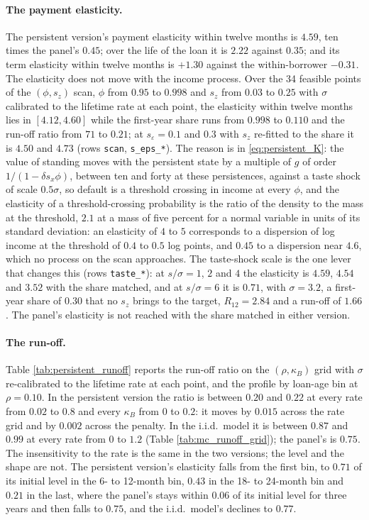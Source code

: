 \paragraph{The payment elasticity.} The persistent version's payment elasticity within twelve months is $4.59$, ten times the panel's $0.45$; over the life of the loan it is $2.22$ against $0.35$; and its term elasticity within twelve months is $+1.30$ against the within-borrower $-0.31$. The elasticity does not move with the income process. Over the 34 feasible points of the $(\phi, s_z)$ scan, $\phi$ from $0.95$ to $0.998$ and $s_z$ from $0.03$ to $0.25$ with $\sigma$ calibrated to the lifetime rate at each point, the elasticity within twelve months lies in $[4.12, 4.60]$ while the first-year share runs from $0.998$ to $0.110$ and the run-off ratio from $71$ to $0.21$; at $s_\varepsilon = 0.1$ and $0.3$ with $s_z$ re-fitted to the share it is $4.50$ and $4.73$ (rows \texttt{scan}, \texttt{s\_eps\_*}). The reason is in \eqref{eq:persistent_K}: the value of standing moves with the persistent state by a multiple of $g$ of order $1/(1 - \delta s_x \phi)$, between ten and forty at these persistences, against a taste shock of scale $0.5\sigma$, so default is a threshold crossing in income at every $\phi$, and the elasticity of a threshold-crossing probability is the ratio of the density to the mass at the threshold, $2.1$ at a mass of five percent for a normal variable in units of its standard deviation: an elasticity of $4$ to $5$ corresponds to a dispersion of log income at the threshold of $0.4$ to $0.5$ log points, and $0.45$ to a dispersion near $4.6$, which no process on the scan approaches. The taste-shock scale is the one lever that changes this (rows \texttt{taste\_*}): at $s/\sigma = 1$, $2$ and $4$ the elasticity is $4.59$, $4.54$ and $3.52$ with the share matched, and at $s/\sigma = 6$ it is $0.71$, with $\sigma = 3.2$, a first-year share of $0.30$ that no $s_z$ brings to the target, $R_{12} = 2.84$ and a run-off of $1.66$. The panel's elasticity is not reached with the share matched in either version.

\paragraph{The run-off.} Table \ref{tab:persistent_runoff} reports the run-off ratio on the $(\rho, \kappa_B)$ grid with $\sigma$ re-calibrated to the lifetime rate at each point, and the profile by loan-age bin at $\rho = 0.10$. In the persistent version the ratio is between $0.20$ and $0.22$ at every rate from $0.02$ to $0.8$ and every $\kappa_B$ from $0$ to $0.2$: it moves by $0.015$ across the rate grid and by $0.002$ across the penalty. In the i.i.d.\ model it is between $0.87$ and $0.99$ at every rate from $0$ to $1.2$ (Table \ref{tab:mc_runoff_grid}); the panel's is $0.75$. The insensitivity to the rate is the same in the two versions; the level and the shape are not. The persistent version's elasticity falls from the first bin, to $0.71$ of its initial level in the 6- to 12-month bin, $0.43$ in the 18- to 24-month bin and $0.21$ in the last, where the panel's stays within $0.06$ of its initial level for three years and then falls to $0.75$, and the i.i.d.\ model's declines to $0.77$.

